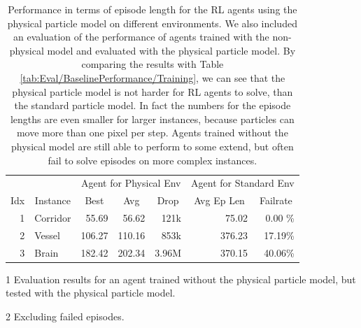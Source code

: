 \begin{table}[htp]
    \begin{center}
        \begin{threeparttable}
            \begin{tabular}{rlrrrrr}
                \toprule
                 &  & \multicolumn{3}{c}{Agent for Physical Env} & \multicolumn{2}{c}{Agent for Standard Env\tnote{1}} \\
                \cmidrule(lr){3-5} \cmidrule(lr){6-7}
                \multicolumn{1}{c}{Idx} & \multicolumn{1}{c}{Instance} & \multicolumn{1}{c}{Best} & \multicolumn{1}{c}{Avg} & \multicolumn{1}{c}{Drop} & \multicolumn{1}{c}{Avg Ep Len} & \multicolumn{1}{c}{Failrate} \\
                \midrule
                1 & Corridor & 55.69 & 56.62 & 121k & 75.02\tnote{2} & 0.00 \%\\
                2 & Vessel & 106.27 & 110.16 & 853k & 376.23\tnote{2} & 17.19\% \\
                3 & Brain & 182.42 & 202.34 & 3.96M & 370.15\tnote{2} & 40.06\% \\
                \bottomrule
            \end{tabular}
            \begin{tablenotes}
                \footnotesize
                \item[1] Evaluation results for an agent trained without the physical particle model, but tested with the physical particle model.
                \item[2] Excluding failed episodes.
            \end{tablenotes}
        \end{threeparttable}
        
    \end{center}
    \caption[Agent Performance on Environments with the Physical Particle Model]{Performance in terms of episode length for the RL agents using the physical particle model on different environments. We also included an evaluation of the performance of agents trained with the non-physical model and evaluated with the physical particle model. By comparing the results with Table \ref{tab:Eval/BaselinePerformance/Training}, we can see that the physical particle model is not harder for RL agents to solve, than the standard particle model. In fact the numbers for the episode lengths are even smaller for larger instances, because particles can move more than one pixel per step. Agents trained without the physical model are still able to perform to some extend, but often fail to solve episodes on more complex instances.} \label{tab:Eval/Physical}
\end{table}

